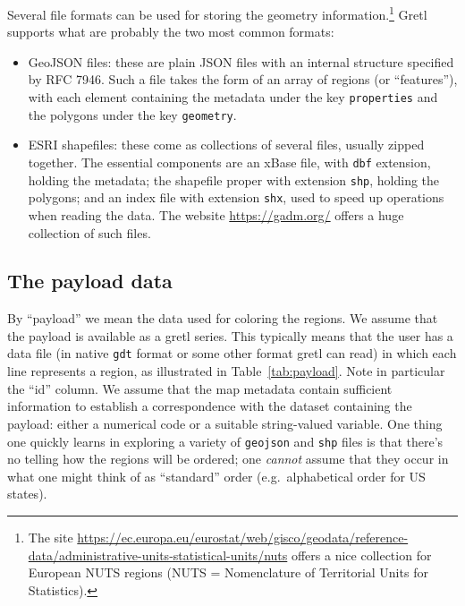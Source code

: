 \documentclass{article}
\begin{document}
Several file formats can be used for storing the geometry
information.\footnote{The site
\url{https://ec.europa.eu/eurostat/web/gisco/geodata/reference-data/administrative-units-statistical-units/nuts}
offers a nice collection for European NUTS regions (NUTS =
Nomenclature of Territorial Units for Statistics).}
Gretl supports what are probably the two most common formats:
\begin{itemize}
\item GeoJSON files: these are plain JSON files with an internal
  structure specified by RFC 7946. Such a file takes the form of an
  array of regions (or ``features''), with each element containing the
  metadata under the key \texttt{properties} and the polygons under
  the key \texttt{geometry}.
\item ESRI shapefiles: these come as collections of several files,
  usually zipped together. The essential components are an
  \textsf{xBase} file, with \texttt{dbf} extension, holding the
  metadata; the shapefile proper with extension \texttt{shp}, holding
  the polygons; and an index file with extension \texttt{shx}, used to
  speed up operations when reading the data. The website
  \url{https://gadm.org/} offers a huge collection of such files.
\end{itemize}

\subsection{The payload data}
\label{sec:payload}

By ``payload'' we mean the data used for coloring the regions.  We
assume that the payload is available as a gretl series. This typically
means that the user has a data file (in native \texttt{gdt} format or
some other format gretl can read) in which each line represents a
region, as illustrated in Table~\ref{tab:payload}. Note in particular
the ``id'' column.  We assume that the map metadata contain sufficient
information to establish a correspondence with the dataset containing
the payload: either a numerical code or a suitable string-valued
variable.  One thing one quickly learns in exploring a variety of
\texttt{geojson} and \texttt{shp} files is that there's no telling how
the regions will be ordered; one \textit{cannot} assume that they
occur in what one might think of as ``standard'' order (e.g.\
alphabetical order for US states).
\end{document}
